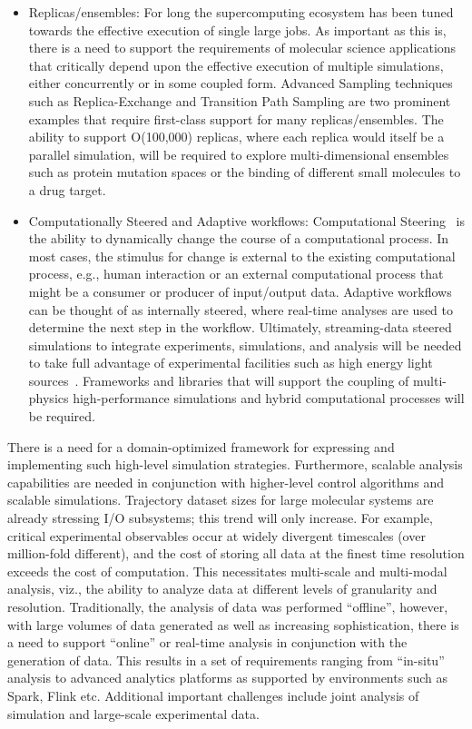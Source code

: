 \documentclass[10pt,letterpaper,draft]{article}
\begin{document}
\begin{itemize}
\item Replicas/ensembles: For long the supercomputing ecosystem has been tuned
  towards the effective execution of single large jobs. As important as this is,
  there is a need to support the requirements of molecular science applications
  that critically depend upon the effective execution of multiple simulations,
  either concurrently or in some coupled form. Advanced Sampling techniques such
  as Replica-Exchange and Transition Path Sampling are two prominent examples
  that require first-class support for many replicas/ensembles. The ability to
  support O(100,000) replicas, where each replica would itself be a parallel
  simulation, will be required to explore multi-dimensional ensembles such as
  protein mutation spaces or the binding of different small molecules to a drug
  target.

\item Computationally Steered and Adaptive workflows: Computational
  Steering~\cite{comp-steer} is the ability to dynamically change the course of
  a computational process. In most cases, the stimulus for change is external to
  the existing computational process, e.g., human interaction or an external
  computational process that might be a consumer or producer of input/output
  data.  Adaptive workflows can be thought of as internally steered, where
  real-time analyses are used to determine the next step in the
  workflow. Ultimately, streaming-data steered simulations to integrate
  experiments, simulations, and analysis will be needed to take full advantage
  of experimental facilities such as high energy light
  sources~\cite{jha1}. Frameworks and libraries that will support the coupling
  of multi-physics high-performance simulations and hybrid computational
  processes will be required.

\end{itemize}

There is a need for a domain-optimized framework for expressing and implementing
such high-level simulation strategies. Furthermore, scalable analysis
capabilities are needed in conjunction with higher-level control algorithms and
scalable simulations. Trajectory dataset sizes for large molecular systems are
already stressing I/O subsystems; this trend will only increase. For example,
critical experimental observables occur at widely divergent timescales (over
million-fold different), and the cost of storing all data at the finest time
resolution exceeds the cost of computation.  This necessitates multi-scale and
multi-modal analysis, viz., the ability to analyze data at different levels of
granularity and resolution. Traditionally, the analysis of data was performed
``offline'', however, with large volumes of data generated as well as increasing
sophistication, there is a need to support ``online'' or real-time analysis in
conjunction with the generation of data. This results in a set of requirements
ranging from ``in-situ'' analysis to advanced analytics platforms as supported
by environments such as Spark, Flink etc.  Additional important challenges
include joint analysis of simulation and large-scale experimental data.
\end{document}

